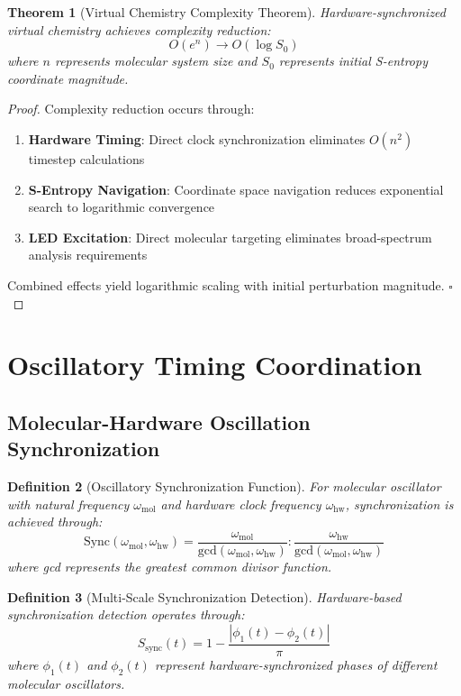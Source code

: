 \documentclass[12pt,a4paper]{article}
\newtheorem{theorem}{Theorem}[section]
\newtheorem{definition}[theorem]{Definition}
\begin{document}
\begin{theorem}[Virtual Chemistry Complexity Theorem]
Hardware-synchronized virtual chemistry achieves complexity reduction:
\begin{equation}
O(e^n) \rightarrow O(\log S_0)
\end{equation}
where $n$ represents molecular system size and $S_0$ represents initial S-entropy coordinate magnitude.
\end{theorem}

\begin{proof}
Complexity reduction occurs through:
\begin{enumerate}
\item \textbf{Hardware Timing}: Direct clock synchronization eliminates $O(n^2)$ timestep calculations
\item \textbf{S-Entropy Navigation}: Coordinate space navigation reduces exponential search to logarithmic convergence
\item \textbf{LED Excitation}: Direct molecular targeting eliminates broad-spectrum analysis requirements
\end{enumerate}
Combined effects yield logarithmic scaling with initial perturbation magnitude. $\square$
\end{proof}

\section{Oscillatory Timing Coordination}

\subsection{Molecular-Hardware Oscillation Synchronization}

\begin{definition}[Oscillatory Synchronization Function]
For molecular oscillator with natural frequency $\omega_{\text{mol}}$ and hardware clock frequency $\omega_{\text{hw}}$, synchronization is achieved through:
\begin{equation}
\text{Sync}(\omega_{\text{mol}}, \omega_{\text{hw}}) = \frac{\omega_{\text{mol}}}{\text{gcd}(\omega_{\text{mol}}, \omega_{\text{hw}})} : \frac{\omega_{\text{hw}}}{\text{gcd}(\omega_{\text{mol}}, \omega_{\text{hw}})}
\end{equation}
where gcd represents the greatest common divisor function.
\end{definition}

\begin{definition}[Multi-Scale Synchronization Detection]
Hardware-based synchronization detection operates through:
\begin{equation}
S_{\text{sync}}(t) = 1 - \frac{|\phi_1(t) - \phi_2(t)|}{\pi}
\end{equation}
where $\phi_1(t)$ and $\phi_2(t)$ represent hardware-synchronized phases of different molecular oscillators.
\end{definition}
\end{document}
